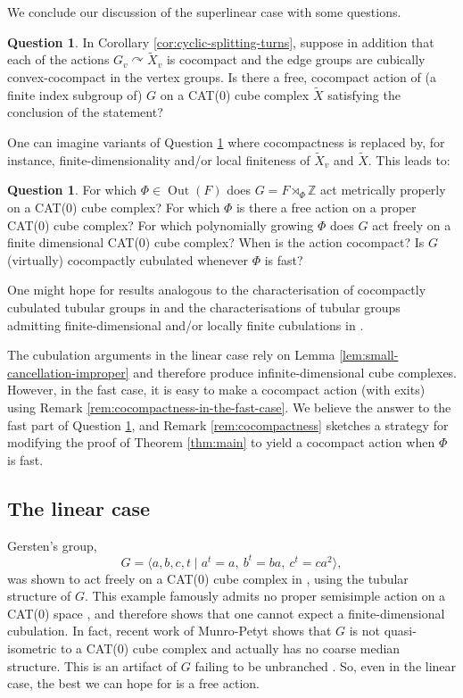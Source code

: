 \documentclass[11pt,oneside]{amsart}
\theoremstyle{definition}
\newtheorem{question}[thm]{Question}
\DeclareMathOperator{\Out}{Out}
\newcommand{\field}[1]{\mathbb{#1}}
\newcommand{\integers}{\ensuremath{\field{Z}}}
\newcommand{\actson}{\curvearrowright}
\begin{document}
We conclude our discussion of the superlinear case with some questions.

\begin{question}\label{question:general-cocompactness}
In Corollary \ref{cor:cyclic-splitting-turns}, suppose in addition that each of the actions $G_v\actson\widetilde X_v$ is cocompact and the edge groups are cubically convex-cocompact in the vertex groups.  Is there a free, cocompact action of (a finite index subgroup of) $G$ on a CAT(0) cube complex $\widetilde X$ satisfying the conclusion of the statement?  
\end{question}

One can imagine variants of Question \ref{question:general-cocompactness} where cocompactness is replaced by, for instance, finite-dimensionality and/or local finiteness of $\widetilde X_v$ and $\widetilde X$.  This leads to:

\begin{question}\label{question:proper}
For which $\Phi\in\Out(F)$ does $G=F\rtimes_\Phi\integers$ act metrically properly on a CAT(0) cube complex? For which $\Phi$ is there a free action on a proper CAT(0) cube complex?  For which polynomially growing $\Phi$ does $G$ act freely on a finite dimensional CAT(0) cube complex?  When is the action cocompact?  Is $G$ (virtually) cocompactly cubulated whenever $\Phi$ is fast?
\end{question}

One might hope for results analogous to the characterisation of cocompactly cubulated tubular groups in \cite{Wise:tubular} and the characterisations of tubular groups admitting finite-dimensional and/or locally finite cubulations in \cite{Woodhouse:fin-dim,Woodhouse:special}.

The cubulation arguments in the linear case rely on Lemma \ref{lem:small-cancellation-improper} and therefore produce infinite-dimensional cube complexes.  However, in the fast case, it is easy to make a cocompact action (with exits) using Remark \ref{rem:cocompactness-in-the-fast-case}.  We believe the answer to the fast part of Question \ref{question:general-cocompactness}, and Remark \ref{rem:cocompactness} sketches a strategy for modifying the proof of Theorem \ref{thm:main} to yield a cocompact action when $\Phi$ is fast.

\subsection{The linear case}\label{subsec:linear-intro}
Gersten's group,
$$G=\langle a,b,c,t\mid a^t=a,\ b^t=ba,\ c^t=ca^2 \rangle,$$
was shown to act freely on a CAT(0) cube complex in \cite{Wise:tubular}, using the tubular structure of $G$.  This example famously admits no proper semisimple action on a CAT(0) space \cite{Gersten}, and therefore shows that one cannot expect a finite-dimensional cubulation.  In fact, recent work of Munro-Petyt \cite{MunroPetyt} shows that $G$ is not quasi-isometric to a CAT(0) cube complex and actually has no coarse median structure.  This is an artifact of $G$ failing to be unbranched \cite{BGGH}.  So, even in the linear case, the best we can hope for is a free action.
\end{document}
